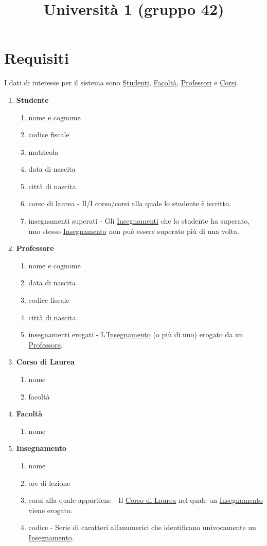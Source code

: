 \documentclass[12pt, letterpaper]{article}
\title{Università 1 (gruppo 42)}
\date{}
\begin{document}
\maketitle


\section{Requisiti}
I dati di interesse per il sistema sono \underline{Studenti}, \underline{Facoltà}, \underline{Professori} e \underline{Corsi}.
\begin{enumerate}
    \item \textbf{Studente}\begin{enumerate}
        \item nome e cognome
        \item codice fiscale 
        \item matricola 
        \item data di nascita 
        \item città di nascita 
        \item corso di laurea - Il/I corso/corsi alla quale lo studente è iscritto.
        \item insegnamenti superati - Gli \underline{Insegnamenti} che lo studente ha superato, uno stesso \underline{Insegnamento} non può essere 
        superato più di una volta.
    \end{enumerate}
    \item \textbf{Professore}\begin{enumerate}
        \item nome e cognome
        \item data di nascita 
        \item codice fiscale 
        \item città di nascita 
        \item insegnamenti erogati - L'\underline{Insegnamento} (o più di uno) erogato da un \underline{Professore}.
    \end{enumerate}
    \item \textbf{Corso di Laurea}\begin{enumerate}
        \item nome 
        \item facoltà
    \end{enumerate}
    \item \textbf{Facoltà}\begin{enumerate}
        \item nome
    \end{enumerate}
    \item \textbf{Insegnamento}\begin{enumerate}
        \item nome 
        \item ore di lezione 
        \item corsi alla quale appartiene - Il \underline{Corso di Laurea} nel quale un \underline{Insegnamento} viene erogato.
        \item codice -  Serie di caratteri alfanumerici che identificano univocamente un \underline{Insegnamento}.
    \end{enumerate}
\end{enumerate}
\newpage
\end{document}
